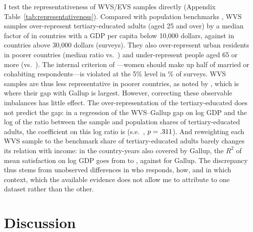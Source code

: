 \documentclass[12pt]{article}
\begin{document}
I test the representativeness of WVS/EVS samples directly (Appendix Table~\ref{tab:representativeness}). Compared with population benchmarks \citep{barro_new_2013,worldbank_wdi_2026}, WVS samples over-represent tertiary-educated adults (aged 25 and over) by a median factor of \ratioTertiaryLow in countries with a GDP per capita below 10,000 dollars, against \ratioTertiaryHigh in countries above 30,000 dollars (\nCompositionSurveys surveys). They also over-represent urban residents in poorer countries (median ratio \ratioUrbanLow vs.\ \ratioUrbanHigh) and under-represent people aged 65 or more (\ratioOldLow vs.\ \ratioOldHigh). The internal criterion of \citet{kohler_surveys_2007}---women should make up half of married or cohabiting respondents---is violated at the 5\% level in \shareGenderFlag\% of surveys. WVS samples are thus less representative in poorer countries, as noted by \citet{deaton_income_2008}, which is where their gap with Gallup is largest. However, correcting these observable imbalances has little effect. The over-representation of the tertiary-educated does not predict the gap: in a regression of the WVS--Gallup gap on log GDP and the log of the ratio between the sample and population shares of tertiary-educated adults, the coefficient on this log ratio is \coefTertiaryGap (s.e.\ \seTertiaryGap, $p = .311$). And reweighting each WVS sample to the benchmark share of tertiary-educated adults barely changes its relation with income: in the country-years also covered by Gallup, the $R^2$ of mean satisfaction on log GDP goes from \RtwoCommonWVSraw to \RtwoCommonWVSeduAdj, against \RtwoCommonGallupSub for Gallup. The discrepancy thus stems from unobserved differences in who responds, how, and in which context, which the available evidence does not allow me to attribute to one dataset rather than the other.


\section{Discussion}\label{sec:discussion} %
\end{document}
